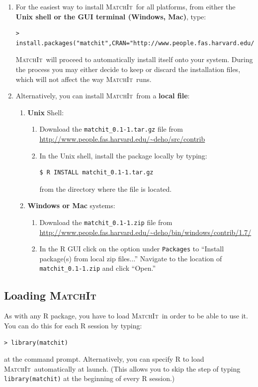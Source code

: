 \documentclass[oneside,letterpaper,titlepage]{article}
\newcommand{\MatchIt}{\textsc{MatchIt}}
\begin{document}
\begin{enumerate} 
\item For the easiest way to install \MatchIt\ for all platforms, from
  either the \textbf{Unix shell or the GUI terminal (Windows, Mac)}, type:
  
  \begin{small}
\begin{verbatim}
> install.packages("matchit",CRAN="http://www.people.fas.harvard.edu/~deho")
\end{verbatim}
  \end{small} 
  
  \noindent \MatchIt\ will proceed to automatically install itself onto
  your system.  During the process you may either decide to keep or
  discard the installation files, which will not affect the way \MatchIt\
  runs. 

\item Alternatively, you can install \MatchIt\ from a \textbf{local file}:
  \begin{enumerate} 
  \item \textbf{Unix} Shell:
    \begin{enumerate}
    \item Download the \texttt{matchit\_0.1-1.tar.gz} file from
      \url{http://www.people.fas.harvard.edu/~deho/src/contrib}
      \item In the Unix shell, install the package locally by typing:
\begin{verbatim}
$ R INSTALL matchit_0.1-1.tar.gz   
\end{verbatim}
        from the directory where the file is located. 
    \end{enumerate}
  \item \textbf{Windows or Mac} systems:
    \begin{enumerate}
    \item Download the \texttt{matchit\_0.1-1.zip} file from 
      \url{http://www.people.fas.harvard.edu/~deho/bin/windows/contrib/1.7/}
    \item In the R GUI click on the option under \texttt{Packages}
      to ``Install package(s) from local zip files...''
      Navigate to the location of \texttt{matchit\_0.1-1.zip} and click ``Open.''
    \end{enumerate}
  \end{enumerate}
\end{enumerate}

\subsection{Loading \MatchIt}
As with any R package, you have to load \MatchIt\ in order to be able
to use it.  You can do this for each R session by typing:
\begin{verbatim}
> library(matchit) 
\end{verbatim}
at the command prompt.  Alternatively, you can specify R to load \MatchIt\
automatically at launch.  (This allows you to skip the step of typing
 {\tt library(matchit)} at the beginning of every R session.)  
\end{document}
